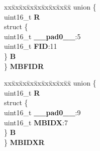 \begin{DoxyCompactItemize}
\begin{tabbing}
\end{tabbing}\item 
\mbox{\label{structuMSG__BUFF__CCS_a36d02ecd8aca9f5d782348a68b788400}} 
\begin{tabbing}
xx\=xx\=xx\=xx\=xx\=xx\=xx\=xx\=xx\=\kill
union \{\\
\>uint16\_t {\bfseries R}\\
\>struct \{\\
\>\>uint16\_t {\bfseries \_\_pad0\_\_}:5\\
\>\>uint16\_t {\bfseries FID}:11\\
\>\} {\bfseries B}\\
\} {\bfseries MBFIDR}\\

\end{tabbing}\item 
\mbox{\label{structuMSG__BUFF__CCS_a12d690438bea0defe6791ebe26e03d4e}} 
\begin{tabbing}
xx\=xx\=xx\=xx\=xx\=xx\=xx\=xx\=xx\=\kill
union \{\\
\>uint16\_t {\bfseries R}\\
\>struct \{\\
\>\>uint16\_t {\bfseries \_\_pad0\_\_}:9\\
\>\>uint16\_t {\bfseries MBIDX}:7\\
\>\} {\bfseries B}\\
\} {\bfseries MBIDXR}\\


\end{tabbing}
\end{DoxyCompactItemize}
